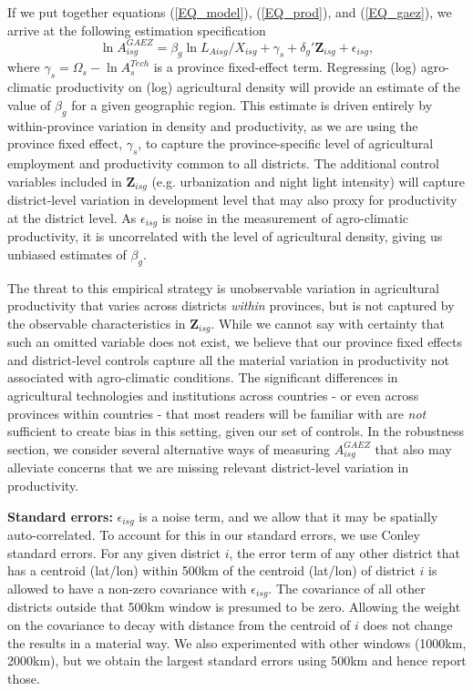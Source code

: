\documentclass[11pt]{article}
\begin{document}
If we put together equations (\ref{EQ_model}), (\ref{EQ_prod}), and (\ref{EQ_gaez}), we arrive at the following estimation specification 
\begin{equation}
	\ln A^{GAEZ}_{isg} = \beta_g \ln L_{Aisg}/X_{isg} + \gamma_{s} + \delta_g' \mathbf{Z}_{isg} + \epsilon_{isg}, \label{EQ_regress}
\end{equation}
where $\gamma_s = \Omega_s - \ln A_{s}^{Tech}$ is a province fixed-effect term. Regressing (log) agro-climatic productivity on (log) agricultural density will provide an estimate of the value of $\beta_g$ for a given geographic region. This estimate is driven entirely by within-province variation in density and productivity, as we are using the province fixed effect, $\gamma_s$, to capture the province-specific level of agricultural employment and productivity common to all districts. The additional control variables included in $\mathbf{Z}_{isg}$ (e.g. urbanization and night light intensity) will capture district-level variation in development level that may also proxy for productivity at the district level. As $\epsilon_{isg}$ is noise in the measurement of agro-climatic productivity, it is uncorrelated with the level of agricultural density, giving us unbiased estimates of $\beta_g$.

The threat to this empirical strategy is unobservable variation in agricultural productivity that varies across districts \textit{within} provinces, but is not captured by the observable characteristics in $\mathbf{Z}_{isg}$. While we cannot say with certainty that such an omitted variable does not exist, we believe that our province fixed effects and district-level controls capture all the material variation in productivity not associated with agro-climatic conditions. The significant differences in agricultural technologies and institutions across countries -  or even across provinces within countries - that most readers will be familiar with are \textit{not} sufficient to create bias in this setting, given our set of controls. In the robustness section, we consider several alternative ways of measuring $A^{GAEZ}_{isg}$ that also may alleviate concerns that we are missing relevant district-level variation in productivity.

\vspace{.5cm}\noindent\textbf{Standard errors:} $\epsilon_{isg}$ is a noise term, and we allow that it may be spatially auto-correlated. To account for this in our standard errors, we use Conley standard errors. For any given district $i$, the error term of any other district that has a centroid (lat/lon) within 500km of the centroid (lat/lon) of district $i$ is allowed to have a non-zero covariance with $\epsilon_{isg}$. The covariance of all other districts outside that 500km window is presumed to be zero. Allowing the weight on the covariance to decay with distance from the centroid of $i$ does not change the results in a material way. We also experimented with other windows (1000km, 2000km), but we obtain the largest standard errors using 500km and hence report those.
\end{document}
